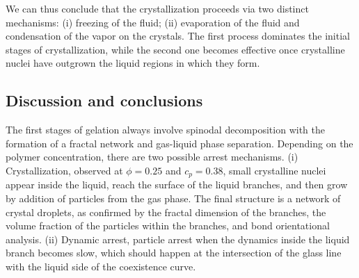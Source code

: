 \documentclass[twocolumn,showpacs,amsmath,amssymb,pre,superscriptaddress]{revtex4}
\begin{document}
We can thus conclude that the crystallization proceeds via two distinct mechanisms:
(i) freezing of the fluid; (ii) evaporation of the fluid and condensation of the vapor on the crystals.
The first process dominates the initial stages of crystallization, while the second one becomes effective once
crystalline nuclei have outgrown the liquid regions in which they form. 
% 

\subsection*{Discussion and conclusions}
The first stages of gelation always involve spinodal decomposition with the formation
of a fractal network and gas-liquid phase separation.
Depending on the polymer concentration, there are two possible arrest mechanisms.
(i) Crystallization, observed at $\phi=0.25$ and $c_p=0.38$, small crystalline nuclei appear inside the liquid, reach the surface
 of the liquid branches, and then grow by addition of particles from the gas phase. The final structure is a network of crystal droplets,
 as confirmed by the fractal dimension of the branches, the volume fraction of the particles within the branches, and bond orientational analysis.
(ii) Dynamic arrest, particle arrest when the dynamics inside the liquid branch becomes slow, which should happen at the intersection of the
 glass line with the liquid side of the coexistence curve.
\end{document}
